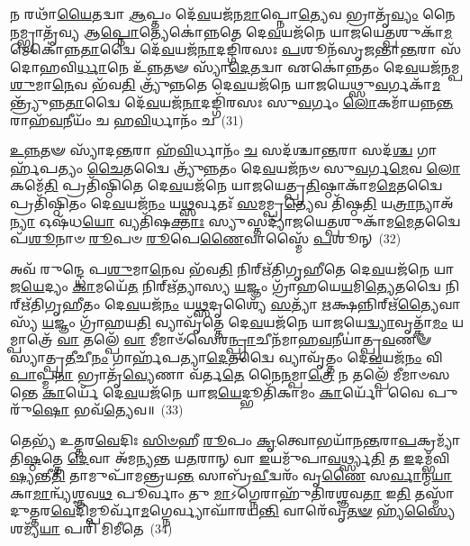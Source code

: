 𑌨 𑌰𑌥𑌾᳴\-\ul{𑌯𑍈}\-𑌤𑌦𑍍𑌵𑌾 \ul{𑌆}\-𑌪𑍍𑌤𑌂 𑌦𑍇᳴\-\ul{𑌵}\-𑌯𑌜᳴𑌨\-\ul{𑌮𑌾}\-𑌪𑍍𑌨𑍋\-\ul{𑌤𑍍𑌯𑍇}\-𑌵 𑌭𑍍𑌰𑌾𑌤𑍃᳴\-\ul{𑌵𑍍𑌯𑌂} 𑌨𑍈\-\ul{𑌨}\-𑌮𑍍𑌭𑍍𑌰𑌾𑌤𑍃᳴𑌵𑍍𑌯 𑌆\-\ul{𑌪𑍍𑌨𑍋}\-𑌤𑍍𑌯𑍇𑌕𑍋॑𑌨𑍍𑌨𑌤𑍇 𑌦𑍇\-\ul{𑌵}\-𑌯𑌜᳴𑌨𑍇 𑌯𑌾𑌜𑌯𑍇\-\ul{𑌤𑍍𑌪}\-𑌶𑍁𑌕𑌾᳴\-\ul{𑌮}\-𑌮𑍇𑌕𑍋॑𑌨𑍍𑌨\-\ul{𑌤𑌾}\-𑌦𑍍𑌵𑍈 𑌦𑍇᳴\-\ul{𑌵}\-𑌯𑌜᳴\-\ul{𑌨𑌾}\-𑌦𑌙𑍍𑌗𑌿᳴𑌰𑌸𑌃 \ul{𑌪}\-𑌶𑍂𑌨᳴𑌸𑍃𑌜𑌨𑍍𑌤𑌾\-\ul{𑌨𑍍𑌤}\-𑌰𑌾 𑌸᳴𑌦𑍋𑌹𑌵𑌿\-\ul{𑌰𑍍𑌧𑌾}\-𑌨𑍇 𑌉᳴\-\ul{𑌨𑍍𑌨}\-𑌤𑍟 𑌸𑍍𑌯𑌾᳴\-\ul{𑌦𑍇}\-𑌤𑌦𑍍𑌵𑌾 𑌏𑌕𑍋॑𑌨𑍍𑌨𑌤𑌂 𑌦𑍇\-\ul{𑌵}\-𑌯𑌜᳴𑌨𑌮𑍍𑌪\-\ul{𑌶𑍁}\-𑌮𑌾\-\ul{𑌨𑍇}\-𑌵 𑌭᳴𑌵\-\ul{𑌤𑌿} 𑌤𑍍𑌰𑍍𑌯𑍁᳴𑌨𑍍𑌨𑌤𑍇 𑌦𑍇\-\ul{𑌵}\-𑌯𑌜᳴𑌨𑍇 𑌯𑌾𑌜𑌯𑍇𑌥𑍍𑌸𑍁\-\ul{𑌵}\-𑌰𑍍𑌗𑌕𑌾᳴\-\ul{𑌮}\-𑌨𑍍𑌤𑍍𑌰𑍍𑌯𑍁᳴𑌨𑍍𑌨\-\ul{𑌤𑌾}\-𑌦𑍍𑌵𑍈 𑌦𑍇᳴\-\ul{𑌵}\-𑌯𑌜᳴\-\ul{𑌨𑌾}\-𑌦𑌙𑍍𑌗𑌿᳴𑌰𑌸𑌃 𑌸𑍁\-\ul{𑌵}\-𑌰𑍍𑌗𑌂 \ul{𑌲𑍋}\-𑌕𑌮𑌾᳴𑌯𑌨𑍍𑌨\-\ul{𑌨𑍍𑌤}\-𑌰𑌾𑌹᳴\-\ul{𑌵}\-𑌨𑍀𑌯𑌂᳴ 𑌚 𑌹\-\ul{𑌵𑌿}\-𑌰𑍍𑌧𑌾𑌨𑌂᳴ 𑌚~(31)

\-\ul{𑌉}\-\-\ul{𑌨𑍍𑌨}\-𑌤𑍟 𑌸𑍍𑌯𑌾᳴𑌦\-\ul{𑌨𑍍𑌤}\-𑌰𑌾 𑌹᳴\-\ul{𑌵𑌿}\-𑌰𑍍𑌧𑌾𑌨𑌂᳴ \ul{𑌚} 𑌸𑌦᳴𑌶𑍍𑌚𑌾\-\ul{𑌨𑍍𑌤}\-𑌰𑌾 𑌸𑌦᳴\-\ul{𑌶𑍍𑌚} 𑌗𑌾𑌰𑍍\mbox{}𑌹᳴𑌪𑌤𑍍𑌯𑌂 \ul{𑌚𑍈}\-𑌤𑌦𑍍𑌵𑍈 𑌤𑍍𑌰𑍍𑌯𑍁᳴𑌨𑍍𑌨𑌤𑌂 𑌦𑍇\-\ul{𑌵}\-𑌯𑌜᳴𑌨𑍞 𑌸𑍁\-\ul{𑌵}\-𑌰𑍍𑌗\-\ul{𑌮𑍇}\-𑌵 \ul{𑌲𑍋}\-𑌕𑌮𑍇᳴\-\ul{𑌤𑌿} 𑌪𑍍𑌰𑌤𑌿᳴𑌷𑍍𑌠𑌿𑌤𑍇 𑌦𑍇\-\ul{𑌵}\-𑌯𑌜᳴𑌨𑍇 𑌯𑌾𑌜𑌯𑍇𑌤𑍍𑌪𑍍𑌰\-\ul{𑌤𑌿}\-𑌷𑍍𑌠𑌾𑌕𑌾᳴𑌮\-\ul{𑌮𑍇}\-𑌤𑌦𑍍𑌵𑍈 𑌪𑍍𑌰𑌤𑌿᳴𑌷𑍍𑌠𑌿𑌤𑌂 𑌦𑍇\-\ul{𑌵}\-𑌯𑌜᳴\-\ul{𑌨𑌂} 𑌯\-\ul{𑌥𑍍𑌸}\-𑌰𑍍𑌵𑌤𑌃᳴ \ul{𑌸}\-𑌮𑌮𑍍𑌪𑍍𑌰\-\ul{𑌤𑍍𑌯𑍇}\-𑌵 𑌤𑌿᳴𑌷𑍍𑌠\-\ul{𑌤𑌿} 𑌯\-\ul{𑌤𑍍𑌰𑌾}\-𑌨𑍍𑌯𑌾𑌅᳴\-\ul{𑌨𑍍𑌯𑌾} 𑌓𑌷᳴𑌧\-\ul{𑌯𑍋} 𑌵𑍍𑌯𑌤𑌿᳴𑌷\-\ul{𑌕𑍍𑌤𑌾𑌃} 𑌸𑍍𑌯𑍁𑌸𑍍𑌤𑌦𑍍𑌯𑌾᳴𑌜𑌯𑍇\-\ul{𑌤𑍍𑌪}\-𑌶𑍁𑌕𑌾᳴𑌮\-\ul{𑌮𑍇}\-𑌤𑌦𑍍𑌵𑍈 𑌪᳴\-\ul{𑌶𑍂}\-𑌨𑌾𑍞 \ul{𑌰𑍂}\-𑌪𑍞 \ul{𑌰𑍂}\-𑌪𑍇\-\ul{𑌣𑍈}\-𑌵𑌾𑌸𑍍𑌮𑍈᳴ \ul{𑌪}\-𑌶𑍂𑌨𑍍~(32)

𑌅𑌵᳴ 𑌰𑍁𑌨𑍍𑌦𑍍𑌧𑍇 𑌪\-\ul{𑌶𑍁}\-𑌮𑌾\-\ul{𑌨𑍇}\-𑌵 𑌭᳴𑌵\-\ul{𑌤𑌿} 𑌨𑌿𑌰𑍍\mbox{}𑌋᳴𑌤𑌿𑌗𑍃𑌹𑍀𑌤𑍇 𑌦𑍇\-\ul{𑌵}\-𑌯𑌜᳴𑌨𑍇 𑌯𑌾𑌜\-\ul{𑌯𑍇}\-𑌦𑍍𑌯𑌂 \ul{𑌕𑌾}\-𑌮𑌯𑍇᳴\-\ul{𑌤} 𑌨𑌿𑌰𑍍\mbox{}𑌋᳴𑌤𑍍𑌯𑌾𑌸𑍍𑌯 \ul{𑌯}\-𑌜𑍍𑌞𑌂 𑌗𑍍𑌰𑌾᳴𑌹𑌯𑍇\-\ul{𑌯}\-𑌮𑌿\-\ul{𑌤𑍍𑌯𑍇}\-𑌤𑌦𑍍𑌵𑍈 𑌨𑌿𑌰𑍍\mbox{}𑌋᳴𑌤𑌿𑌗𑍃𑌹𑍀𑌤𑌂 𑌦𑍇\-\ul{𑌵}\-𑌯𑌜᳴\-\ul{𑌨𑌂} 𑌯\-\ul{𑌥𑍍𑌸}\-𑌦𑍃𑌶𑍍𑌯𑍈᳴ \ul{𑌸}\-𑌤𑍍𑌯𑌾᳴ \ul{𑌋}\-𑌕𑍍𑌷𑌨𑍍𑌨𑌿𑌰𑍍\mbox{}𑌋᳴\-\ul{𑌤𑍍𑌯𑍈}\-𑌵𑌾𑌸𑍍𑌯᳴ \ul{𑌯}\-𑌜𑍍𑌞𑌂 𑌗𑍍𑌰𑌾᳴𑌹𑌯\-\ul{𑌤𑌿} 𑌵𑍍𑌯𑌾𑌵𑍃᳴𑌤𑍍𑌤𑍇 𑌦𑍇\-\ul{𑌵}\-𑌯𑌜᳴𑌨𑍇 𑌯𑌾𑌜𑌯𑍇\-\ul{𑌦𑍍𑌵𑍍𑌯𑌾}\-𑌵𑍃𑌤𑍍𑌕𑌾᳴\-\ul{𑌮𑌂} 𑌯𑌮𑍍𑌪𑌾𑌤𑍍𑌰𑍇᳴ \ul{𑌵𑌾} 𑌤𑌲𑍍𑌪𑍇᳴ \ul{𑌵𑌾} 𑌮𑍀𑌮𑌾𑍞᳴𑌸𑍇𑌰\-\ul{𑌨𑍍𑌪𑍍𑌰𑌾}\-𑌚𑍀𑌨᳴𑌮𑌾𑌹\-\ul{𑌵}\-𑌨𑍀𑌯𑌾॑𑌤𑍍𑌪𑍍𑌰\-\ul{𑌵}\-𑌣𑍟 𑌸𑍍𑌯𑌾॑𑌤𑍍𑌪𑍍𑌰\-\ul{𑌤𑍀}\-𑌚𑍀\-\ul{𑌨𑌂} 𑌗𑌾𑌰𑍍\mbox{}𑌹᳴𑌪𑌤𑍍𑌯𑌾\-\ul{𑌦𑍇}\-𑌤𑌦𑍍𑌵𑍈 𑌵𑍍𑌯𑌾𑌵𑍃᳴𑌤𑍍𑌤𑌂 𑌦𑍇\-\ul{𑌵}\-𑌯𑌜᳴\-\ul{𑌨𑌂} 𑌵𑌿 \ul{𑌪𑌾}\-𑌪𑍍𑌮\-\ul{𑌨𑌾} 𑌭𑍍𑌰𑌾𑌤𑍃᳴\-\ul{𑌵𑍍𑌯𑍇}\-𑌣𑌾 𑌵᳴𑌰𑍍𑌤\-\ul{𑌤𑍇} 𑌨𑍈\-\ul{𑌨}\-𑌮𑍍𑌪𑌾\-\ul{𑌤𑍍𑌰𑍇} 𑌨 𑌤𑌲𑍍𑌪𑍇᳴ 𑌮𑍀𑌮𑌾𑍞𑌸𑌨𑍍𑌤𑍇 \ul{𑌕𑌾}\-𑌰𑍍𑌯𑍇᳴ 𑌦𑍇\-\ul{𑌵}\-𑌯𑌜᳴𑌨𑍇 𑌯𑌾𑌜\-\ul{𑌯𑍇}\-𑌦𑍍𑌭𑍂𑌤𑌿᳴𑌕𑌾𑌮𑌂 \ul{𑌕𑌾}\-𑌰𑍍𑌯𑍋᳴ 𑌵𑍈 𑌪𑍁𑌰𑍁᳴\-\ul{𑌷𑍋} 𑌭𑌵᳴\-\ul{𑌤𑍍𑌯𑍇}\-𑌵॥~(33)

{\anuvakamend[{𑌯𑌾\-\ul{𑌤}\-𑌵𑍈 𑌹᳴\-\ul{𑌵𑌿}\-𑌰𑍍𑌧𑌾𑌨᳴𑌞𑍍𑌚 \ul{𑌪}\-𑌶𑍂\-\ul{𑌨𑍍𑌪𑌾}\-𑌪𑍍𑌮\-\ul{𑌨𑌾}\-\-𑌽𑌷𑍍𑌟𑌾𑌦᳴𑌶 𑌚}]}%

𑌤𑍇𑌭𑍍𑌯᳴ 𑌉𑌤𑍍𑌤𑌰\-\ul{𑌵𑍇}\-𑌦𑌿𑌃 \ul{𑌸𑌿}\-\-\ul{𑍞}\-𑌹𑍀 \ul{𑌰𑍂}\-𑌪𑌂 \ul{𑌕𑍃}\-𑌤𑍍𑌵𑍋𑌭𑌯𑌾᳴𑌨\-\ul{𑌨𑍍𑌤}\-𑌰𑌾\-\ul{𑌪}\-𑌕𑍍𑌰𑌮𑍍𑌯𑌾᳴𑌤𑌿\-\ul{𑌷𑍍𑌠}\-𑌤𑍍𑌤𑍇 \ul{𑌦𑍇}\-𑌵𑌾 𑌅᳴𑌮𑌨𑍍𑌯𑌨𑍍𑌤 𑌯\-\ul{𑌤}\-𑌰𑌾𑌨𑍍 𑌵𑌾 \ul{𑌇}\-𑌯𑌮𑍁᳴𑌪𑌾\-\ul{𑌵}\-𑌰𑍍𑌥𑍍𑌸𑍍𑌯\-\ul{𑌤𑌿} 𑌤 \ul{𑌇}\-𑌦𑌮𑍍𑌭᳴𑌵𑌿\-\ul{𑌷𑍍𑌯}\-𑌨𑍍𑌤𑍀\-\ul{𑌤𑌿} 𑌤𑌾𑌮𑍁𑌪𑌾᳴𑌮𑌨𑍍𑌤𑍍𑌰𑌯\-\ul{𑌨𑍍𑌤} 𑌸𑌾𑌬𑍍𑌰᳴\-\ul{𑌵𑍀}\-𑌦𑍍𑌵𑌰𑌂᳴ 𑌵𑍃\-\ul{𑌣𑍈} 𑌸\-\ul{𑌰𑍍𑌵𑌾}\-𑌨𑍍𑌮\-\ul{𑌯𑌾} 𑌕𑌾\-\ul{𑌮𑌾}\-𑌨𑍍𑌵𑍍𑌯᳴𑌶𑍍𑌞𑌵\-\ul{𑌥} 𑌪𑍂𑌰𑍍𑌵𑌾𑌂 𑌤𑍁 \ul{𑌮𑌾}\-\-𑌽𑌗𑍍𑌨𑍇𑌰𑌾𑌹𑍁᳴𑌤𑌿𑌰𑌶𑍍𑌞𑌵\-\ul{𑌤𑌾} 𑌇\-\ul{𑌤𑌿} 𑌤𑌸𑍍𑌮𑌾᳴𑌦𑍁𑌤𑍍𑌤𑌰\-\ul{𑌵𑍇}\-𑌦𑌿𑌮𑍍𑌪𑍂𑌰𑍍𑌵𑌾᳴\-\ul{𑌮}\-𑌗𑍍𑌨𑍇𑌰𑍍𑌵𑍍𑌯𑌾𑌘𑌾᳴𑌰𑌯\-\ul{𑌨𑍍𑌤𑌿} 𑌵𑌾𑌰𑍇᳴𑌵𑍃\-\ul{𑌤}\-\-\ul{𑍟} 𑌹𑍍𑌯᳴\-\ul{𑌸𑍍𑌯𑍈} 𑌶𑌮𑍍𑌯᳴\-\ul{𑌯𑌾} 𑌪𑌰𑌿᳴ 𑌮𑌿𑌮𑍀𑌤𑍇~(34)


